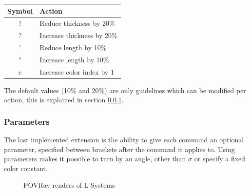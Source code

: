 \documentclass[11pt,a4paper]{article}
\begin{document}
\begin{center}
\begin{tabular}{c | l}
Symbol & Action \\ \hline
! & Reduce thickness by 20\% \\
? & Increase thickness by 20\% \\
' & Reduce length by 10\% \\
" & Increase length by 10\% \\
c & Increase color index by 1
\end{tabular}
\end{center}

The default values (10\% and 20\%) are only guidelines which can be modified per action, this is explained in section \ref{parameters}.


\subsubsection{Parameters}
\label{parameters}
The last implemented extension is the ability to give each command an optional parameter, specified between brackets after the command it applies to. Using parameters makes it possible to turn by an angle, other than $\sigma$ or specify a fixed color constant.

\begin{figure}[h!]
  \centering
  \caption{POVRay renders of L-Systems}
  \label{fig:povrenders}
\end{figure}
\end{document}
